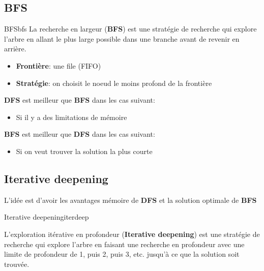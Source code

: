 \subsection{BFS} %
\label{sub:bfs} 

\begin{definition}{BFS}{bfs}
    La recherche en largeur (\textbf{BFS}) est une stratégie de recherche qui explore l'arbre en allant le plus large possible dans une branche avant de revenir en arrière. 
    \begin{itemize}
        \item \textbf{Frontière}: une file (FIFO)
        \item \textbf{Stratégie}: on choisit le noeud le moins profond de la frontière
    \end{itemize} 
\end{definition} 

\textbf{DFS} est meilleur que \textbf{BFS} dans les cas suivant: 
\begin{itemize}
    \item Si il y a des limitations de mémoire 
\end{itemize}

\textbf{BFS} est meilleur que \textbf{DFS} dans les cas suivant: 
\begin{itemize}
    \item Si on veut trouver la solution la plus courte
\end{itemize}

\subsection{Iterative deepening} %
\label{sub:iterative_deepening}
\begin{note}
    L'idée est d'avoir les avantages mémoire de \textbf{DFS} et la solution optimale de \textbf{BFS}
\end{note}

\begin{definition}{Iterative deepening}{iterdeep}

    L'exploration itérative en profondeur (\textbf{Iterative deepening}) est une stratégie de 
    recherche qui explore l'arbre en faisant une recherche en profondeur avec une limite de profondeur de 
    1, puis 2, puis 3, etc. jusqu'à ce que la solution soit trouvée.


\end{definition}

